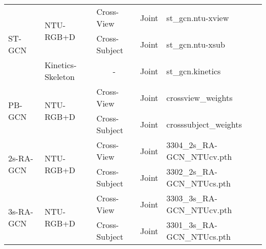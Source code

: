 \documentclass[runningheads]{llncs}
\begin{document}
\begin{table}[h]
{\begin{tabular}{|l|l|l|l|l|}
\multirow{3}{*}{ST-GCN \cite{yan2018spatial}} 
                         & \multirow{2}{*}{NTU-RGB+D}         & \multirow{1}{*}{Cross-View}    & Joint &st\_gcn.ntu-xview\\ \cline{4-5} 
                         \cline{3-5} 
                         &                                    & \multirow{1}{*}{Cross-Subject} & Joint &st\_gcn.ntu-xsub\\ \cline{4-5} 
                         \cline{2-5} 
                         & \multirow{1}{*}{Kinetics-Skeleton} & \multicolumn{1}{c|}{-}         & Joint &st\_gcn.kinetics\\ \cline{3-5} 
                          \hline
 
 
\multirow{2}{*}{PB-GCN \cite{thakkar2018part}} 
                         & \multirow{2}{*}{NTU-RGB+D}         & \multirow{1}{*}{Cross-View}    & Joint &crossview\_weights\\ \cline{4-5} 
                         \cline{3-5} 
                         &                                    & \multirow{1}{*}{Cross-Subject} & Joint &crosssubject\_weights\\ \cline{4-5} 
                         \cline{2-5} 
                         \cline{3-5} 
                         \hline
\multirow{2}{*}{2s-RA-GCN \cite{song2019richly}} 
                         & \multirow{2}{*}{NTU-RGB+D}         & \multirow{1}{*}{Cross-View}    & Joint &3304\_2s\_RA-GCN\_NTUcv.pth\\ \cline{4-5} 
                         \cline{3-5} 
                         &                                    & \multirow{1}{*}{Cross-Subject} & Joint &3302\_2s\_RA-GCN\_NTUcs.pth\\ \cline{4-5} 
                         \cline{2-5} 
                         \cline{3-5} 
                         \hline
                         
\multirow{2}{*}{3s-RA-GCN \cite{song2019richly}} 
                         & \multirow{2}{*}{NTU-RGB+D}         & \multirow{1}{*}{Cross-View}    & Joint &3303\_3s\_RA-GCN\_NTUcv.pth\\ \cline{4-5} 
                         \cline{3-5} 
                         &                                    & \multirow{1}{*}{Cross-Subject} & Joint &3301\_3s\_RA-GCN\_NTUcs.pth\\ \cline{4-5} 
                         \cline{2-5} 
                         \cline{3-5} 
                         \hline


\end{tabular}}
\end{table}
\end{document}
